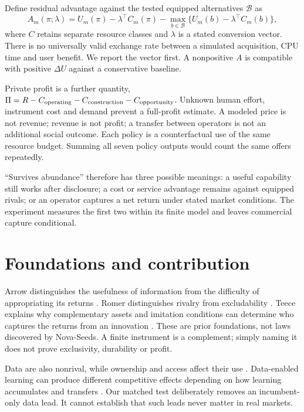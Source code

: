 \documentclass[11pt]{article}
\begin{document}
Define residual advantage against the tested equipped alternatives $\mathcal B$ as
\begin{equation}
A_m(\pi;\lambda)=U_m(\pi)-\lambda^\top C_m(\pi)
-\max_{b\in\mathcal B}\{U_m(b)-\lambda^\top C_m(b)\},
\end{equation}
where $C$ retains separate resource classes and $\lambda$ is a stated conversion vector. There is no universally valid exchange rate between a simulated acquisition, CPU time and user benefit. We report the vector first. A nonpositive $A$ is compatible with positive $\Delta U$ against a conservative baseline.

Private profit is a further quantity, $\Pi=R-C_{\rm operating}-C_{\rm construction}-C_{\rm opportunity}$. Unknown human effort, instrument cost and demand prevent a full-profit estimate. A modeled price is not revenue; revenue is not profit; a transfer between operators is not an additional social outcome. Each policy is a counterfactual use of the same resource budget. Summing all seven policy outputs would count the same offers repeatedly.

``Survives abundance'' therefore has three possible meanings: a useful capability still works after disclosure; a cost or service advantage remains against equipped rivals; or an operator captures a net return under stated market conditions. The experiment measures the first two within its finite model and leaves commercial capture conditional.

\section{Foundations and contribution}
Arrow distinguishes the usefulness of information from the difficulty of appropriating its returns \citep{arrow1962}. Romer distinguishes rivalry from excludability \citep{romer1990}. Teece explains why complementary assets and imitation conditions can determine who captures the returns from an innovation \citep{teece1986}. These are prior foundations, not laws discovered by Nova-Seeds. A finite instrument is a complement; simply naming it does not prove exclusivity, durability or profit.

Data are also nonrival, while ownership and access affect their use \citep{jonestonetti2020}. Data-enabled learning can produce different competitive effects depending on how learning accumulates and transfers \citep{hagiuwright2023}. Our matched test deliberately removes an incumbent-only data lead. It cannot establish that such leads never matter in real markets.
\end{document}
